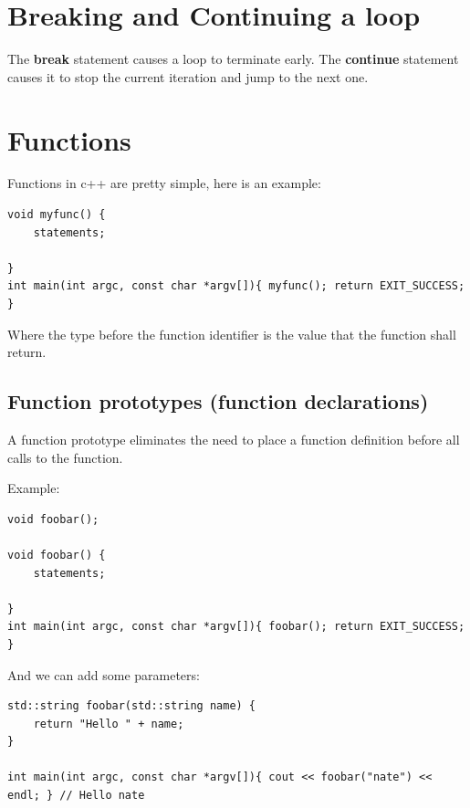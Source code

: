 \documentclass{report}
\begin{document}
    \pagebreak \bigbreak \noindent 
    \section{\LARGE Breaking and Continuing a loop}
    \bigbreak \noindent 
    \begin{concept}
 The \textbf{break} statement causes a loop to terminate early. The \textbf{continue} statement causes it to stop the current iteration and jump to the next one.
	\end{concept}

    \pagebreak \bigbreak \noindent 
    \section{\LARGE Functions}
    \bigbreak \noindent 
    Functions in c++ are pretty simple, here is an example:
    \bigbreak \noindent 
    \sepline
    \begin{verbatim}
void myfunc() {
    statements;

}
int main(int argc, const char *argv[]){ myfunc(); return EXIT_SUCCESS; }
    \end{verbatim}
    \sepline
    \bigbreak \noindent 
    Where the type before the function identifier is the value that the function shall return.
    \bigbreak \noindent 
    \subsection{Function prototypes (function declarations)}
    \bigbreak \noindent 
    \begin{concept}
 A function prototype eliminates the need to place a function definition before all calls to the function.
	\end{concept}
    \bigbreak \noindent 
    Example:
    \bigbreak \noindent 
    \sepline
    \begin{verbatim}
void foobar();

void foobar() {
    statements;

}
int main(int argc, const char *argv[]){ foobar(); return EXIT_SUCCESS; }
    \end{verbatim}
    \sepline
    \bigbreak \noindent 
    \bigbreak \noindent 
    And we can add some parameters:
    \bigbreak \noindent 
    \sepline
    \begin{verbatim}
std::string foobar(std::string name) {
    return "Hello " + name;
}  

int main(int argc, const char *argv[]){ cout << foobar("nate") << endl; } // Hello nate 
    \end{verbatim}
    \sepline
\end{document}
